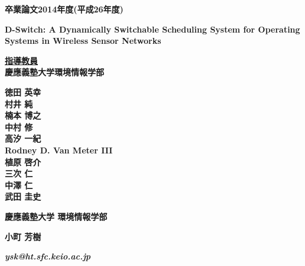 \pagestyle{empty}

\begin{center}

\vspace{5cm}

\textbf{\Large 卒業論文2014年度(平成26年度)}

\vspace{1cm}

\textbf{\LARGE D-Switch: A Dynamically Switchable Scheduling System for Operating Systems in Wireless Sensor Networks}
\vspace{2cm}

\textbf{\underline{\large 指導教員}}\\
\textbf{慶應義塾大学環境情報学部}

\textbf{\Large 徳田 英幸}\\
\textbf{\Large 村井 純}\\
\textbf{\Large 楠本 博之}\\
\textbf{\Large 中村 修}\\
\textbf{\Large 高汐 一紀}\\
\textbf{\Large Rodney D. Van Meter III}\\
\textbf{\Large 植原 啓介}\\
\textbf{\Large 三次 仁}\\
\textbf{\Large 中澤 仁}\\
\textbf{\Large 武田 圭史}

\vspace{6cm}

\textbf{\LARGE 慶應義塾大学 環境情報学部}

\vspace{.5em}

\textbf{\LARGE 小町 芳樹}

\vspace{.3em}

\textbf{\it ysk@ht.sfc.keio.ac.jp}



\newpage

\end{center}

\pagestyle{plain}
